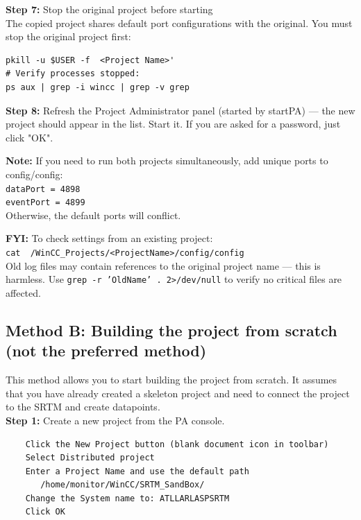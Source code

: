 \documentclass[11pt,a4paper]{article}
\begin{document}
\noindent\textbf{Step 7:} Stop the original project before starting\\

\noindent The copied project shares default port configurations with the original. You must stop the original project first:
\begin{lstlisting}
pkill -u $USER -f  <Project Name>'
# Verify processes stopped:
ps aux | grep -i wincc | grep -v grep
\end{lstlisting}

\noindent\textbf{Step 8:} Refresh the Project Administrator panel (started by startPA) — the new project should appear in the list. Start it. If you are asked for a password, just click "OK".

\begin{tipbox}
\textbf{Note:} If you need to run both projects simultaneously, add unique ports to config/config:\\
\texttt{dataPort = 4898}\\
\texttt{eventPort = 4899}\\
Otherwise, the default ports will conflict.
\end{tipbox}

\begin{tipbox}
\textbf{FYI:} To check settings from an existing project:\\
\texttt{cat ~/WinCC\_Projects/<ProjectName>/config/config}\\[0.3cm]
Old log files may contain references to the original project name — this is harmless. Use \texttt{grep -r 'OldName' . 2>/dev/null} to verify no critical files are affected.
\end{tipbox}


\subsection{Method B: Building the project from scratch (not the preferred method)}

This method allows you to start building the project from scratch. It assumes that you have already created a skeleton project and need to connect the project to the SRTM and create datapoints.\\

\noindent\textbf{Step 1:} Create a new project from the PA console.
\begin{lstlisting}
    Click the New Project button (blank document icon in toolbar)
    Select Distributed project
    Enter a Project Name and use the default path
       /home/monitor/WinCC/SRTM_SandBox/
    Change the System name to: ATLLARLASPSRTM
    Click OK
\end{lstlisting}
\end{document}
